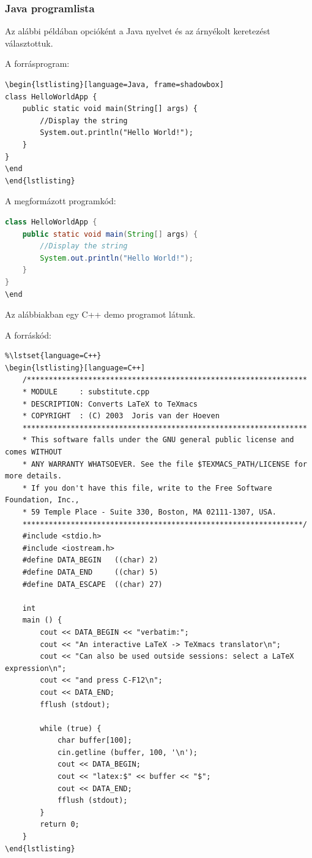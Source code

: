 \documentclass{article}
\begin{document}
\subsubsection*{Java  programlista}
Az alábbi példában opcióként a Java nyelvet és az árnyékolt keretezést választottuk.

A forrásprogram:

{\small
\begin{verbatim}
\begin{lstlisting}[language=Java, frame=shadowbox]
class HelloWorldApp {
    public static void main(String[] args) {
        //Display the string
        System.out.println("Hello World!");
    }
}
\end
\end{lstlisting}
\end{verbatim}
}

  A megformázott programkód:

\begin{lstlisting}[language=Java, frame=shadowbox]
class HelloWorldApp {
    public static void main(String[] args) {
        //Display the string
        System.out.println("Hello World!");
    }
}
\end
\end{lstlisting}

Az alábbiakban egy  C++ demo programot látunk.

A forráskód:
\begin{verbatim}
%\lstset{language=C++}
\begin{lstlisting}[language=C++]
	/****************************************************************
	* MODULE     : substitute.cpp
	* DESCRIPTION: Converts LaTeX to TeXmacs
	* COPYRIGHT  : (C) 2003  Joris van der Hoeven
	*****************************************************************
	* This software falls under the GNU general public license and comes WITHOUT
	* ANY WARRANTY WHATSOEVER. See the file $TEXMACS_PATH/LICENSE for more details.
	* If you don't have this file, write to the Free Software Foundation, Inc.,
	* 59 Temple Place - Suite 330, Boston, MA 02111-1307, USA.
	****************************************************************/
	#include <stdio.h>
	#include <iostream.h>
	#define DATA_BEGIN   ((char) 2)
	#define DATA_END     ((char) 5)
	#define DATA_ESCAPE  ((char) 27)
	
	int
	main () {
		cout << DATA_BEGIN << "verbatim:";
		cout << "An interactive LaTeX -> TeXmacs translator\n";
		cout << "Can also be used outside sessions: select a LaTeX expression\n";
		cout << "and press C-F12\n";
		cout << DATA_END;
		fflush (stdout);
		
		while (true) {
			char buffer[100];
			cin.getline (buffer, 100, '\n');
			cout << DATA_BEGIN;
			cout << "latex:$" << buffer << "$";
			cout << DATA_END;
			fflush (stdout);
		}
		return 0;
	}
\end{lstlisting}
\end{verbatim}
\end{document}
